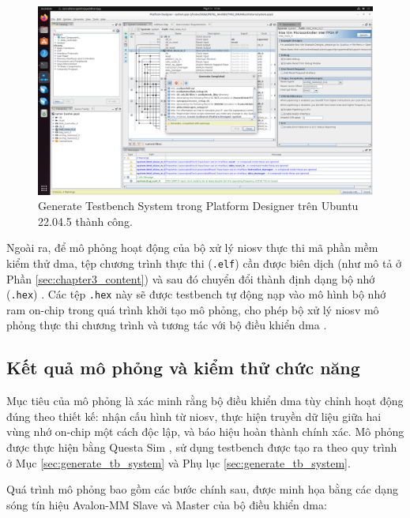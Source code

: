 \begin{figure}[htbp]
    \centering
    \includegraphics[width=\linewidth]{Images/04_00_UbuntuGenerateTestbenchSystem.png}
    \caption{Generate Testbench System trong Platform Designer trên Ubuntu 22.04.5 thành công.}
    \label{fig:04_01_UbuntuGenerateTestbenchSystem}
\end{figure}

Ngoài ra, để mô phỏng hoạt động của bộ xử lý \acrshort{niosv} thực thi mã phần mềm kiểm thử \acrshort{dma}, tệp chương trình thực thi (\texttt{.elf}) cần được biên dịch (như mô tả ở Phần \ref{sec:chapter3_content}) và sau đó chuyển đổi thành định dạng bộ nhớ (\texttt{.hex}) \cite{intelNiosVSoftwareDevHandbook}. Các tệp \texttt{.hex} này sẽ được testbench tự động nạp vào mô hình bộ nhớ \acrshort{ram} on-chip trong quá trình khởi tạo mô phỏng, cho phép bộ xử lý \acrshort{niosv} mô phỏng thực thi chương trình và tương tác với bộ điều khiển \acrshort{dma} \cite{intelNiosVHandbook}.

\subsection{Kết quả mô phỏng và kiểm thử chức năng}
\label{sec:simulation_results} %

Mục tiêu của mô phỏng là xác minh rằng bộ điều khiển \acrshort{dma} tùy chỉnh hoạt động đúng theo thiết kế: nhận cấu hình từ \acrshort{niosv}, thực hiện truyền dữ liệu giữa hai vùng nhớ on-chip một cách độc lập, và báo hiệu hoàn thành chính xác. Mô phỏng được thực hiện bằng Questa Sim \cite{intelNiosVHandbook}, sử dụng testbench được tạo ra theo quy trình ở Mục \ref{sec:generate_tb_system} và Phụ lục \ref{sec:generate_tb_system}.

Quá trình mô phỏng bao gồm các bước chính sau, được minh họa bằng các dạng sóng tín hiệu Avalon-MM Slave và Master của bộ điều khiển \acrshort{dma}:

